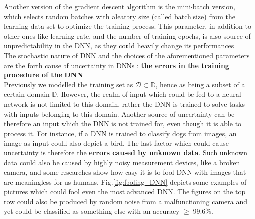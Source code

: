 Another version of the gradient descent algorithm is the mini-batch version, which selects random batches with aleatory size (called batch size) from the learning data-set to optimize the training process. \cite{ruder2017overview} This parameter, in addition to other ones like learning rate, and the number of training epochs, is also source of unpredictability in the DNN, as they could heavily change its performances  \\
The stochastic nature of DNN and the choices of the aforementioned parameters are the forth cause of uncertainty in DNNs : \textbf{the errors in the training procedure of the DNN}\\
Previously we modelled the training set as $\mathcal{D} \subset \mathbb{D}$, hence as being a subset of a certain domain $\mathbb{D}$. However, the realm of input which could be fed to a neural network is not limited to this domain, rather the DNN is trained to solve tasks with inputs belonging to this domain. Another source of uncertainty can be therefore an input which the DNN is not trained for, even though it is able to process it. For instance, if a DNN is trained to classify dogs from images, an image as input could also depict a bird. The last factor which could cause uncertainty is therefore the \textbf{errors caused by unknown data}. Such unknown data could also be caused by highly noisy measurement devices, like a broken camera, and some researches show how easy it is to fool DNN with images that are meaningless for us humans.\cite{nguyen2015deep} Fig.\ref{fig:fooling_DNN} depicts some examples of pictures which could fool even the most advanced DNN. The figures on the top row could also be produced by random noise from a malfunctioning camera and yet could be classified as something else with an accuracy $\geq$ 99.6\%. \cite{nguyen2015deep}\\
